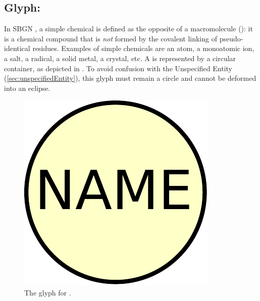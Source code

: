 
\subsection{Glyph: }
\label{sec:simpleChemical}

In SBGN \PDs, a simple chemical is defined as the opposite of a macromolecule (): it is a chemical compound that is \emph{not} formed by the covalent linking of pseudo-identical residues.  Examples of simple chemicals are an atom, a monoatomic ion, a salt, a radical, a solid metal, a crystal, etc. A  is represented by a circular
container, as depicted in . To avoid confusion with the Unspecified Entity (\ref{sec:unspecifiedEntity}), this glyph must remain a circle and cannot be deformed into an eclipse.

\begin{figure}[H]
  \centering
  \includegraphics[scale = 0.3]{images/simpleChemical}
  \caption{The \PD glyph for .}
  \label{fig:simpleChemical}
\end{figure}
